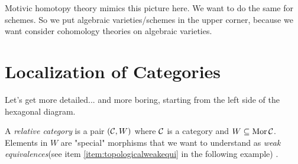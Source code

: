 \documentclass[class=report, crop=false,a4paper,twoside]{standalone}
\begin{document}
Motivic homotopy theory mimics this picture here. We want to do the same for schemes. So we put algebraic varieties/schemes in the upper corner, because we want consider cohomology theories on algebraic varieties.

\section{Localization of Categories}
Let's get more detailed... and more boring, starting from the left side of the hexagonal diagram.

\begin{definition}
	A \emph{relative category} is a pair $(\mathcal{C}, W)$ where $\mathcal{C}$ is a category and $W \subseteq \operatorname{Mor}\mathcal{C}$. \\
	Elements in $W$ are "special" morphisms that we want to understand as \emph{weak equivalences}(see item \ref{item:topologicalweakequi} in the following example) .
\end{definition}
\end{document}
